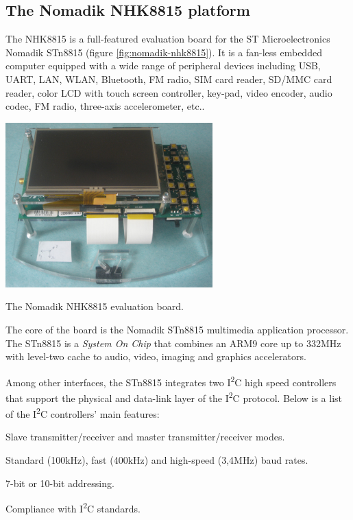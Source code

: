 \documentclass[a4paper,10pt]{article}
\makeatletter
\newenvironment{figurehere}{\def\@captype{figure}\vspace{2ex}}{\vspace{2ex}}
\newenvironment{packed_items}{
\begin{itemize}
  \setlength{\itemsep}{3pt}
  \setlength{\parskip}{0pt}
  \setlength{\parsep}{0pt}
}{\end{itemize}}
\newcommand{\icc}{I\textsuperscript{2}C }
\makeatother
\begin{document}
\begin{multicols}{2}
\subsection{The Nomadik NHK8815 platform}
\label{sec:nomadik_nhk8815_platform}
The NHK8815 is a full-featured evaluation board for the ST Microelectronics
Nomadik STn8815 (figure \ref{fig:nomadik-nhk8815}). It is a fan-less embedded
computer equipped with a wide range of peripheral devices including USB, UART,
LAN, WLAN, Bluetooth, FM radio, SIM card reader, SD/MMC card reader, color LCD
with touch screen controller, key-pad, video encoder, audio codec, FM radio,
three-axis accelerometer, etc..

\begin{figurehere}
 \centering
 \includegraphics[width=8cm, height=6.35cm]{./figures/nomadik-nhk8815.jpg}
 \caption{The Nomadik NHK8815 evaluation board.}
 \label{fig:nomadik-nhk8815}
\end{figurehere}

The core of the board is the Nomadik STn8815 multimedia application processor.
The STn8815 is a \emph{System On Chip} that combines an ARM9 core up to 332MHz
with level-two cache to audio, video, imaging and graphics accelerators.

Among other interfaces, the STn8815 integrates two \icc high speed controllers
that support the physical and data-link layer of the \icc protocol.
Below is a list of the \icc controllers' main features:
\begin{packed_items}
	\item Slave transmitter/receiver and master transmitter/receiver modes.
	\item Standard (100kHz), fast (400kHz) and high-speed (3,4MHz) baud rates.
	\item 7-bit or 10-bit addressing.
	\item Compliance with \icc standards.
\end{packed_items}


\end{multicols}
\end{document}
